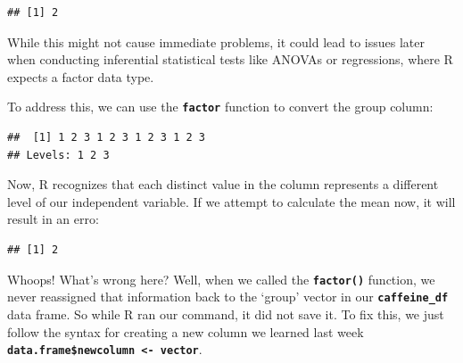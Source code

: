 \documentclass[
]{book}
\newenvironment{Shaded}{\begin{snugshade}}{\end{snugshade}}
\newcommand{\FunctionTok}[1]{\textcolor[rgb]{0.13,0.29,0.53}{\textbf{#1}}}
\newcommand{\NormalTok}[1]{#1}
\newcommand{\SpecialCharTok}[1]{\textcolor[rgb]{0.81,0.36,0.00}{\textbf{#1}}}
\begin{document}
\begin{Shaded}
\end{Shaded}

\begin{verbatim}
## [1] 2
\end{verbatim}

While this might not cause immediate problems, it could lead to issues later when conducting inferential statistical tests like ANOVAs or regressions, where R expects a factor data type.

To address this, we can use the \textbf{\texttt{factor}} function to convert the group column:

\begin{Shaded}
\end{Shaded}

\begin{verbatim}
##  [1] 1 2 3 1 2 3 1 2 3 1 2 3
## Levels: 1 2 3
\end{verbatim}

Now, R recognizes that each distinct value in the column represents a different level of our independent variable. If we attempt to calculate the mean now, it will result in an erro:

\begin{Shaded}
\end{Shaded}

\begin{verbatim}
## [1] 2
\end{verbatim}

Whoops! What's wrong here? Well, when we called the \textbf{\texttt{factor()}} function, we never reassigned that information back to the `group' vector in our \textbf{\texttt{caffeine\_df}} data frame. So while R ran our command, it did not save it. To fix this, we just follow the syntax for creating a new column we learned last week \textbf{\texttt{data.frame\$newcolumn\ \textless{}-\ vector}}.
\end{document}
